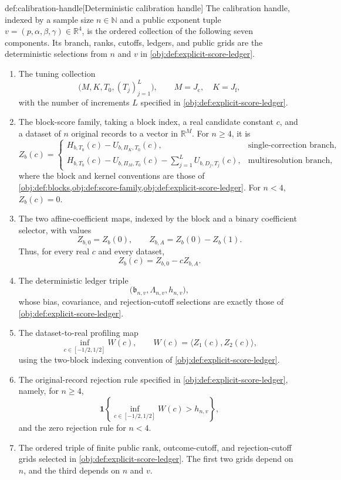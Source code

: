 \begin{algorithmv}{def:calibration-handle}[Deterministic calibration handle]
The calibration handle, indexed by a sample size \(n\in\mathbb N\) and a public exponent tuple \(v=(p,\alpha,\beta,\gamma)\in\mathbb R^4\), is the ordered collection of the following seven components. Its branch, ranks, cutoffs, ledgers, and public grids are the deterministic selections from \(n\) and \(v\) in \cref{obj:def:explicit-score-ledger}.

\begin{enumerate}
\item The tuning collection
\[
\bigl(M,K,T_0,(T_j)_{j=1}^{L}\bigr),
\qquad M=J_{\mathrm c},\quad K=J_{\mathrm f},
\]
with the number of increments \(L\) specified in \cref{obj:def:explicit-score-ledger}.

\item The block-score family, taking a block index, a real candidate constant \(c\), and a dataset of \(n\) original records to a vector in \(\mathbb R^M\). For \(n\ge4\), it is
\[
Z_b(c)=
\begin{cases}
H_{b,T_0}(c)-U_{b,\Pi_K,T_0}(c),
&\text{single-correction branch},\\[1mm]
H_{b,T_0}(c)-U_{b,\Pi_M,T_0}(c)
-\displaystyle\sum_{j=1}^{L}U_{b,D_j,T_j}(c),
&\text{multiresolution branch},
\end{cases}
\]
where the block and kernel conventions are those of
\cref{obj:def:blocks,obj:def:score-family,obj:def:explicit-score-ledger}.
For \(n<4\), \(Z_b(c)=0\).

\item The two affine-coefficient maps, indexed by the block and a binary coefficient selector, with values
\[
Z_{b,0}=Z_b(0),
\qquad
Z_{b,A}=Z_b(0)-Z_b(1).
\]
Thus, for every real \(c\) and every dataset,
\[
Z_b(c)=Z_{b,0}-cZ_{b,A}.
\]

\item The deterministic ledger triple
\[
\bigl(\mathfrak b_{n,v},\Lambda_{n,v},h_{n,v}\bigr),
\]
whose bias, covariance, and rejection-cutoff selections are exactly those of
\cref{obj:def:explicit-score-ledger}.

\item The dataset-to-real profiling map
\[
\inf_{c\in[-1/2,1/2]}W(c),
\qquad
W(c)=\langle Z_1(c),Z_2(c)\rangle,
\]
using the two-block indexing convention of
\cref{obj:def:explicit-score-ledger}.

\item The original-record rejection rule specified in
\cref{obj:def:explicit-score-ledger}, namely, for \(n\ge4\),
\[
\mathbf 1\!\left\{
\inf_{c\in[-1/2,1/2]}W(c)>h_{n,v}
\right\},
\]
and the zero rejection rule for \(n<4\).

\item The ordered triple of finite public rank, outcome-cutoff, and rejection-cutoff grids selected in \cref{obj:def:explicit-score-ledger}. The first two grids depend on \(n\), and the third depends on \(n\) and \(v\).
\end{enumerate}
\end{algorithmv}

